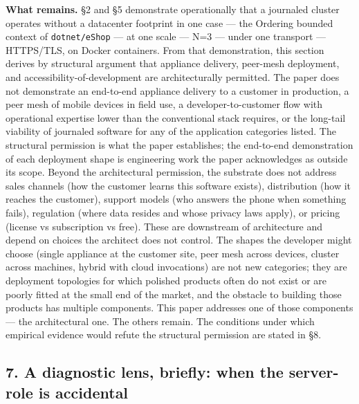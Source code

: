 \documentclass[
]{article}
\begin{document}
\textbf{What remains.} §2 and §5 demonstrate operationally that a
journaled cluster operates without a datacenter footprint in one case
--- the Ordering bounded context of \texttt{dotnet/eShop} --- at one
scale --- N=3 --- under one transport --- HTTPS/TLS, on Docker
containers. From that demonstration, this section derives by structural
argument that appliance delivery, peer-mesh deployment, and
accessibility-of-development are architecturally permitted. The paper
does not demonstrate an end-to-end appliance delivery to a customer in
production, a peer mesh of mobile devices in field use, a
developer-to-customer flow with operational expertise lower than the
conventional stack requires, or the long-tail viability of journaled
software for any of the application categories listed. The structural
permission is what the paper establishes; the end-to-end demonstration
of each deployment shape is engineering work the paper acknowledges as
outside its scope. Beyond the architectural permission, the substrate
does not address sales channels (how the customer learns this software
exists), distribution (how it reaches the customer), support models (who
answers the phone when something fails), regulation (where data resides
and whose privacy laws apply), or pricing (license vs subscription vs
free). These are downstream of architecture and depend on choices the
architect does not control. The shapes the developer might choose
(single appliance at the customer site, peer mesh across devices,
cluster across machines, hybrid with cloud invocations) are not new
categories; they are deployment topologies for which polished products
often do not exist or are poorly fitted at the small end of the market,
and the obstacle to building those products has multiple components.
This paper addresses one of those components --- the architectural one.
The others remain. The conditions under which empirical evidence would
refute the structural permission are stated in §8.

\subsection{7. A diagnostic lens, briefly: when the server-role is
accidental}\label{a-diagnostic-lens-briefly-when-the-server-role-is-accidental}
\end{document}
